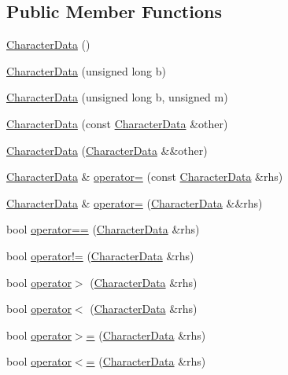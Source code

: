 \subsection*{Public Member Functions}
\begin{DoxyCompactItemize}
\item 
\hyperlink{struct_character_data_ace49d29c55eeb48f7fd511841df40c27}{Character\-Data} ()
\item 
\hyperlink{struct_character_data_abcb9f0bd43c518b28e02065b171d7551}{Character\-Data} (unsigned long b)
\item 
\hyperlink{struct_character_data_a28743377c793f39f4203ae71a4a40da9}{Character\-Data} (unsigned long b, unsigned m)
\item 
\hyperlink{struct_character_data_a9c4f926d20bfcbeaaf9496791160c09d}{Character\-Data} (const \hyperlink{struct_character_data}{Character\-Data} \&other)
\item 
\hyperlink{struct_character_data_a6e4a98d0dfcffd3155846515a9903900}{Character\-Data} (\hyperlink{struct_character_data}{Character\-Data} \&\&other)
\item 
\hyperlink{struct_character_data}{Character\-Data} \& \hyperlink{struct_character_data_a0118f9a14b08db8bf36870ac1043c780}{operator=} (const \hyperlink{struct_character_data}{Character\-Data} \&rhs)
\item 
\hyperlink{struct_character_data}{Character\-Data} \& \hyperlink{struct_character_data_a8241609b7d0abaf5135fc965234dc1d7}{operator=} (\hyperlink{struct_character_data}{Character\-Data} \&\&rhs)
\item 
bool \hyperlink{struct_character_data_a815d34f2397d83e26a850f7327e121f8}{operator==} (\hyperlink{struct_character_data}{Character\-Data} \&rhs)
\item 
bool \hyperlink{struct_character_data_acc34abfc386287c8c38d0de255aa3442}{operator!=} (\hyperlink{struct_character_data}{Character\-Data} \&rhs)
\item 
bool \hyperlink{struct_character_data_a662008be5f99b06b927ba1def39a12f3}{operator$>$} (\hyperlink{struct_character_data}{Character\-Data} \&rhs)
\item 
bool \hyperlink{struct_character_data_a8531abd07619859ef83ac3ad3e3c3329}{operator$<$} (\hyperlink{struct_character_data}{Character\-Data} \&rhs)
\item 
bool \hyperlink{struct_character_data_a8f31e2a333183cb8c5c5bb2518933ee0}{operator$>$=} (\hyperlink{struct_character_data}{Character\-Data} \&rhs)
\item 
bool \hyperlink{struct_character_data_a8eef34f1395329eb392fb293f7de687d}{operator$<$=} (\hyperlink{struct_character_data}{Character\-Data} \&rhs)

\end{DoxyCompactItemize}

